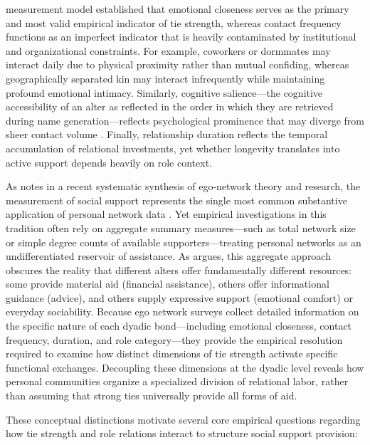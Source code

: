 \documentclass[12pt]{article}
\begin{document}
\citet{marsden1984measuring} measurement model established that emotional closeness serves as the primary and most valid empirical indicator of tie strength, whereas contact frequency functions as an imperfect indicator that is heavily contaminated by institutional and organizational constraints. For example, coworkers or dormmates may interact daily due to physical proximity rather than mutual confiding, whereas geographically separated kin may interact infrequently while maintaining profound emotional intimacy. Similarly, cognitive salience---the cognitive accessibility of an alter as reflected in the order in which they are retrieved during name generation---reflects psychological prominence that may diverge from sheer contact volume \citep{kitts2014beyond}. Finally, relationship duration reflects the temporal accumulation of relational investments, yet whether longevity translates into active support depends heavily on role context.

As \citet{smith2021continued} notes in a recent systematic synthesis of ego-network theory and research, the measurement of social support represents the single most common substantive application of personal network data \citep{cornwell2008social, fischer1982dwell, wellman1990different}. Yet empirical investigations in this tradition often rely on aggregate summary measures---such as total network size or simple degree counts of available supporters---treating personal networks as an undifferentiated reservoir of assistance. As \citet{smith2021continued} argues, this aggregate approach obscures the reality that different alters offer fundamentally different resources: some provide material aid (financial assistance), others offer informational guidance (advice), and others supply expressive support (emotional comfort) or everyday sociability. Because ego network surveys collect detailed information on the specific nature of each dyadic bond---including emotional closeness, contact frequency, duration, and role category---they provide the empirical resolution required to examine how distinct dimensions of tie strength activate specific functional exchanges. Decoupling these dimensions at the dyadic level reveals how personal communities organize a specialized division of relational labor, rather than assuming that strong ties universally provide all forms of aid.

These conceptual distinctions motivate several core empirical questions regarding how tie strength and role relations interact to structure social support provision:
\end{document}
